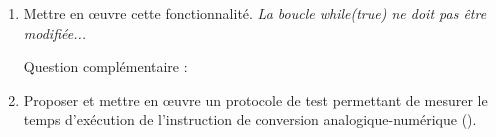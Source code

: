 \documentclass[a4paper]{book}%
\begin{document}
\begin{large}
\begin{enumerate}
	\medskip

		\item Mettre en \oe{}uvre cette fonctionnalité. \textit{La boucle while(true) ne doit pas être modifiée...}
	
	\bigskip
	
	Question complémentaire :
	
	\medskip
	
		\item Proposer et mettre en \oe{}uvre un protocole de test permettant de mesurer le temps d'exécution de l'instruction de conversion analogique-numérique ().
	
	\end{enumerate}

	\end{large}
	
	
	
\end{document}
